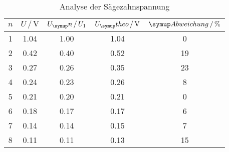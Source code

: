 \begin{table}
  \centering
  \begin{tabular}{c c c c c}
    \toprule
    $n$ & $U \,/\,\si{\volt}$ & $U_\su{n}\,/\,U_1$ & $U_\su{theo}\,/\,\si{\volt}$
    & $\su{Abweichung}\,/\, \%$ \\
    \midrule
    1   &   1.04  &   1.00  &   1.04    &   0   \\
    2   &   0.42  &   0.40  &   0.52    &   19   \\
    3   &   0.27  &   0.26  &   0.35    &   23   \\
    4   &   0.24  &   0.23  &   0.26    &   8   \\
    5   &   0.21  &   0.20  &   0.21    &   0   \\
    6   &   0.18  &   0.17  &   0.17    &   6   \\
    7   &   0.14  &   0.14  &   0.15    &   7   \\
    8   &   0.11  &   0.11  &   0.13    &   15   \\
    \bottomrule
  \end{tabular}
  \caption{Analyse der Sägezahnspannung}
  \label{tab:anasaeg}
\end{table}
